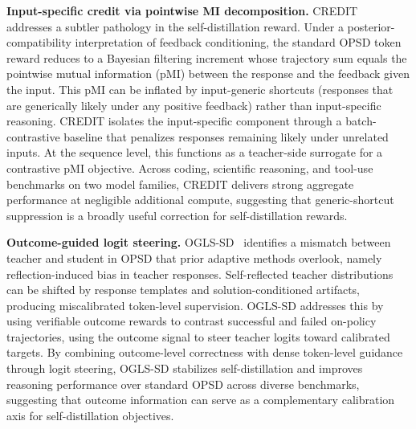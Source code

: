 \documentclass{article} %
\begin{document}
\textbf{Input-specific credit via pointwise MI decomposition.} CREDIT~\citep{2605.11613} addresses a subtler pathology in the self-distillation reward. Under a posterior-compatibility interpretation of feedback conditioning, the standard OPSD token reward reduces to a Bayesian filtering increment whose trajectory sum equals the pointwise mutual information (pMI) between the response and the feedback given the input. This pMI can be inflated by input-generic shortcuts (responses that are generically likely under any positive feedback) rather than input-specific reasoning. CREDIT isolates the input-specific component through a batch-contrastive baseline that penalizes responses remaining likely under unrelated inputs. At the sequence level, this functions as a teacher-side surrogate for a contrastive pMI objective. Across coding, scientific reasoning, and tool-use benchmarks on two model families, CREDIT delivers strong aggregate performance at negligible additional compute, suggesting that generic-shortcut suppression is a broadly useful correction for self-distillation rewards.

\textbf{Outcome-guided logit steering.} OGLS-SD~\citep{2605.12400} identifies a mismatch between teacher and student in OPSD that prior adaptive methods overlook, namely reflection-induced bias in teacher responses. Self-reflected teacher distributions can be shifted by response templates and solution-conditioned artifacts, producing miscalibrated token-level supervision. OGLS-SD addresses this by using verifiable outcome rewards to contrast successful and failed on-policy trajectories, using the outcome signal to steer teacher logits toward calibrated targets. By combining outcome-level correctness with dense token-level guidance through logit steering, OGLS-SD stabilizes self-distillation and improves reasoning performance over standard OPSD across diverse benchmarks, suggesting that outcome information can serve as a complementary calibration axis for self-distillation objectives.
\end{document}
